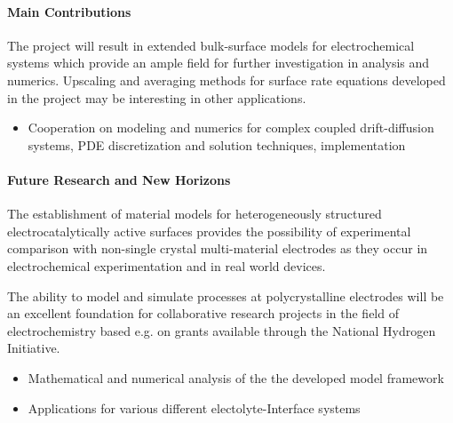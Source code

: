 \documentclass[a4paper,10pt]{article}
\newcommand{\bibfilename}{mrabbrev,mybibfile} %
\begin{document}
\paragraph{Main Contributions}
The project will result in extended bulk-surface models for electrochemical systems which provide
an ample field for further investigation in analysis and numerics. Upscaling and averaging methods
for surface rate equations developed in the project may be interesting in other applications.

\begin{itemize}
\item Cooperation on modeling and numerics for complex coupled drift-diffusion systems, PDE
  discretization and solution techniques, implementation
\end{itemize}


\paragraph{Future Research and New Horizons}
The establishment of material models for heterogeneously structured electrocatalytically active surfaces
provides the possibility of experimental comparison with non-single crystal multi-material electrodes
as they occur in electrochemical experimentation and in real world devices.

The ability to model and simulate processes at polycrystalline electrodes will be an excellent foundation
for collaborative research projects in the field of electrochemistry based e.g. on grants available through
the National Hydrogen Initiative.

\begin{itemize}
\item Mathematical and numerical  analysis  of the the developed model framework
\item Applications for various different electolyte-Interface systems
\end{itemize}


\nocite{*} %


\end{document}
